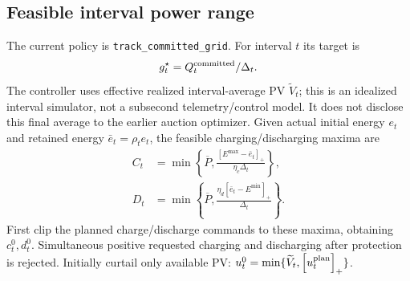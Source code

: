 \documentclass[11pt,a4paper]{article}
\newcommand{\pos}[1]{\left[#1\right]_+}
\begin{document}
\subsection{Feasible interval power range}
The current policy is \texttt{track\_committed\_grid}. For interval $t$ its target is
\begin{equation}
 g_t^\star=Q_t^{\rm committed}/\Delta_t.
\end{equation}
The controller uses effective realized interval-average PV $\widetilde V_t$;
this is an idealized interval simulator, not a subsecond telemetry/control model.
It does not disclose this final average to the earlier auction optimizer.
Given actual initial energy $e_t$ and retained energy $\bar e_t=\rho_t e_t$,
the feasible charging/discharging maxima are
\begin{align}
 C_t&=\min\left\{\overline P,
           \frac{\pos{E^{\max}-\bar e_t}}{\eta_c\Delta_t}\right\},\\
 D_t&=\min\left\{\overline P,
           \frac{\eta_d\pos{\bar e_t-E^{\min}}}{\Delta_t}\right\}.
\end{align}
First clip the planned charge/discharge commands to these maxima, obtaining
$c_t^0,d_t^0$. Simultaneous positive requested charging and discharging after
protection is rejected. Initially curtail only available PV:
$u_t^0=\min\{\widetilde V_t,\pos{u_t^{\rm plan}}\}$.
\end{document}
